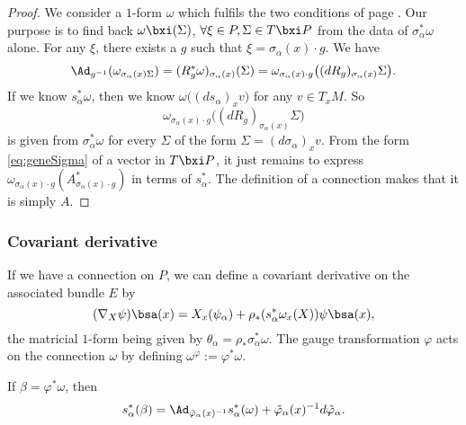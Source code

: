 \begin{proof}
We consider a $1$-form $\omega$ which fulfils the two conditions of page \pageref{pg:def:conne}. Our purpose is to find back $\omega\bxi(\Sigma)$, $\forall\xi\in P,\Sigma\in T\bxi P$ from the data of $\sigma_{\alpha}^*\omega$ alone. For any $\xi$, there exists a $g$ such that $\xi=\sigma_{\alpha}(x)\cdot g$. We have
\begin{equation}
  \Ad_{g^{-1}}(\omega_{\sigma_{\alpha}(x)\Sigma})=(R^*_g\omega)_{\sigma_{\alpha}(x)}(\Sigma)
             =\omega_{\sigma_{\alpha}(x)\cdot g}\big( (dR_g)_{\sigma_{\alpha}(x)}\Sigma \big).
\end{equation}
If we know $s_{\alpha}^*\omega$, then we know $\omega\big(  (ds_{\alpha})_xv  \big)$ for any $v\in T_xM$. So
\[
   \omega_{\sigma_{\alpha}(x)\cdot g}\big( (dR_g)_{\sigma_{\alpha}(x)}\Sigma\big)
\]
is given from $\sigma_{\alpha}^*\omega$ for every $\Sigma$ of the form $\Sigma=(d\sigma_{\alpha})_xv$. From the form \eqref{eq:geneSigma} of a vector in $T\bxi P$, it just remains to express $\omega_{\sigma_{\alpha}(x)\cdot g}(A^*_{\sigma_{\alpha}(x)\cdot g})$ in terms of $s_{\alpha}^*$. The definition of a connection makes that it is simply $A$.

\end{proof}

\subsubsection{Covariant derivative}

If we have a connection on $P$, we can define a covariant derivative on the associated bundle $E$ by
\[
  (\nabla_X\psi)\bsa(x)=X_x(\psi_{\alpha})+\rho_*( s_{\alpha}^*\omega_x(X) )\psi\bsa(x),
\]
the matricial $1$-form being given by $\theta_{\alpha}=\rho_*\sigma^*_{\alpha}\omega$. The gauge transformation $\varphi$ acts on the connection $\omega$ by defining $\omega^{\varphi}:=\varphi^*\omega$.

\begin{proposition}
If $\beta=\varphi^*\omega$, then
\[
   s^*_{\alpha}(\beta)=\Ad_{\tilde{\varphi}_{\alpha}(x)^{-1}}s^*_{\alpha}(\omega)+\tilde{\varphi}_{\alpha}(x)^{-1} d\tilde{\varphi}_{\alpha}.
\]
\end{proposition}

